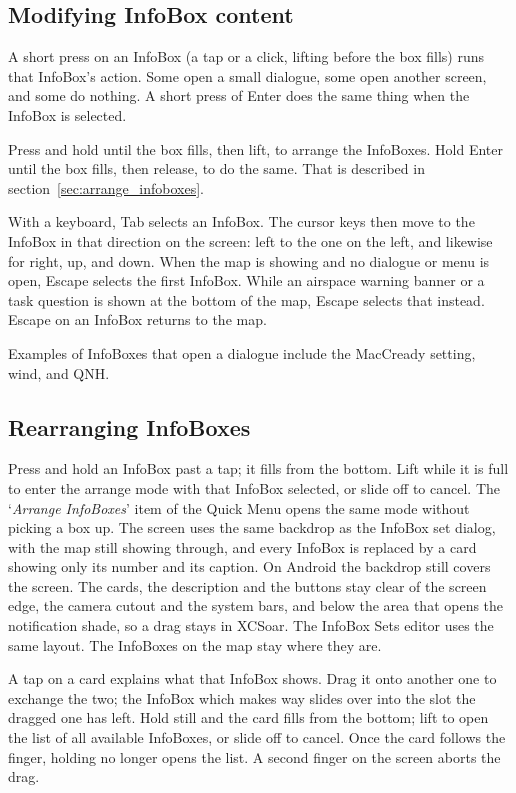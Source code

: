 \subsection*{Modifying InfoBox content}

A short press on an InfoBox (a tap or a click, lifting before the box
fills) runs that InfoBox's action.  Some open a small dialogue, some
open another screen, and some do nothing.  A short press of Enter
does the same thing when the InfoBox is selected.

Press and hold until the box fills, then lift, to arrange the
InfoBoxes.  Hold Enter until the box fills, then release, to do the
same.  That is described in section~\ref{sec:arrange_infoboxes}.

With a keyboard, Tab selects an InfoBox.  The cursor keys then move
to the InfoBox in that direction on the screen: left to the one on
the left, and likewise for right, up, and down.  When the map is
showing and no dialogue or menu is open, Escape selects the first
InfoBox.  While an airspace warning banner or a task question is
shown at the bottom of the map, Escape selects that instead.  Escape
on an InfoBox returns to the map.

Examples of InfoBoxes that open a dialogue include the MacCready
setting, wind, and QNH.


\subsection*{Rearranging InfoBoxes}\label{sec:arrange_infoboxes}

Press and hold an InfoBox past a tap; it fills from the bottom.
Lift while it is full to enter the arrange mode with that InfoBox
selected, or slide off to cancel.  The `\emph{Arrange InfoBoxes}'
item of the Quick Menu opens the same mode without picking a box up.
The screen uses the same backdrop as the InfoBox set dialog, with the
map still showing through, and every InfoBox is replaced by a card
showing only its number and its caption.
On Android the backdrop still covers the screen.  The cards, the
description and the buttons stay clear of the screen edge, the camera
cutout and the system bars, and below the area that opens the
notification shade, so a drag stays in XCSoar.  The InfoBox Sets
editor uses the same layout.  The InfoBoxes on the map stay where
they are.

A tap on a card explains what that InfoBox shows.  Drag it onto
another one to exchange the two; the InfoBox which makes way slides
over into the slot the dragged one has left.  Hold still and the card fills from the bottom; lift to open the
list of all available InfoBoxes, or slide off to cancel.  Once the
card follows the finger, holding no longer opens the list.  A second
finger on the screen aborts the drag.

